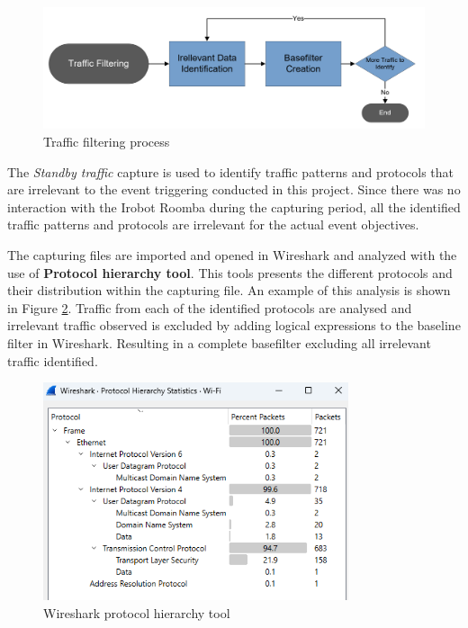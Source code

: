 \begin{figure}[H]
    \centering
    \includegraphics[width=\textwidth]{figures/TrafficProcessingProcess.png}
    \caption{Traffic filtering process}
    \label{fig:TrafficProcessingProcess}
\end{figure}

The \textit{Standby traffic} capture is used to identify traffic patterns and protocols that are irrelevant to the event triggering conducted in this project. Since there was no interaction with the Irobot Roomba during the capturing period, all the identified traffic patterns and protocols are irrelevant for the actual event objectives. 

The capturing files are imported and opened in Wireshark and analyzed with the use of \textbf{Protocol hierarchy tool}. This tools presents the different protocols and their distribution within the capturing file. An example of this analysis is shown in Figure \ref{fig:wiresharkprotocolstatistictools}. Traffic from each of the identified protocols are analysed and irrelevant traffic observed is excluded by adding logical expressions to the baseline filter in Wireshark. Resulting in a complete basefilter excluding all irrelevant traffic identified. 

\begin{figure}[H]
    \centering
    \includegraphics[width=0.8\textwidth]{figures/wireshark_protocol_hirarcy.png}
    \caption{Wireshark protocol hierarchy tool}
    \label{fig:wiresharkprotocolstatistictools}
\end{figure}

